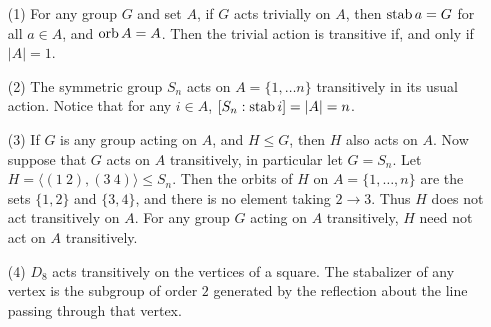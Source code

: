 \begin{example}\label{example_4.4}
  \begin{enumerate}
    \item[(1)] For any group $G$ and set  $A$, if  $G$ acts trivially on
      $A$, then  $\operatorname{stab}{a}=G$ for all $a \in A$, and  $\operatorname{orb}{A}=A$. Then
      the trivial action is transitive if, and only if $|A|=1$.

    \item[(2)] The symmetric group $S_n$ acts on  $A=\{1, \dots n\}$
      transitively in its usual action. Notice that for any $i \in A$,
      $[S_n:\operatorname{stab}{i}]=|A|=n$.

    \item[(3)] If $G$ is any group acting on $A$, and  $H \leq G$, then  $H$
      also acts on $A$. Now suppose that  $G$ acts on  $A$ transitively, in
      particular let $G=S_n$. Let  $H=\langle (1 \ 2),(3 \ 4) \rangle \leq
      S_n$. Then the orbits of  $H$ on  $A=\{1, \dots, n\}$ are the sets
      $\{1,2\}$ and $\{3,4\}$, and there is no element taking $2 \rightarrow 3$.
      Thus $H$ does not act transitively on $A$. For any group $G$ acting on
      $A$ transitively,  $H$ need not act on  $A$ transitively.

    \item[(4)] $D_8$ acts transitively on the vertices of a square. The
      stabalizer of any vertex is the subgroup of order $2$ generated by the
      reflection about the line passing through that vertex.
  \end{enumerate}
\end{example}

